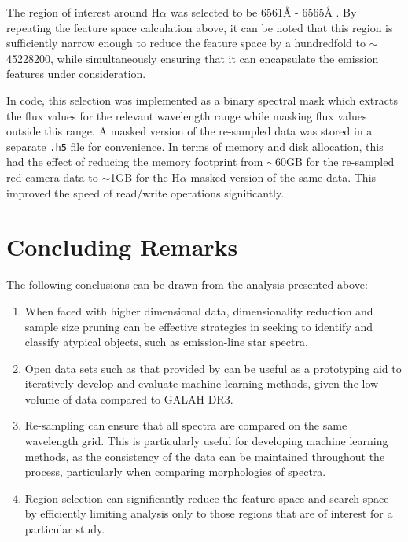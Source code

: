 The region of interest around H$\alpha$ was selected to be 6561\r{A} - 6565\r{A} \citep{traven2017galah}. By repeating the feature space calculation above, it can be noted that this region is sufficiently narrow enough to reduce the feature space by a hundredfold to $\sim$ \num[round-precision=2,round-mode=figures, scientific-notation=true]{45228200}, while simultaneously ensuring that it can encapsulate the emission features under consideration. 

In code, this selection was implemented as a binary spectral mask which extracts the flux values for the relevant wavelength range while masking flux values outside this range. A masked version of the re-sampled data was stored in a separate \texttt{.h5} file for convenience. In terms of memory and disk allocation, this had the effect of reducing the memory footprint from $\sim$60GB for the re-sampled red camera data to $\sim$1GB for the H$\alpha$ masked version of the same data. This improved the speed of read/write operations significantly. 

\section{Concluding Remarks}

The following conclusions can be drawn from the analysis presented above:

\begin{enumerate}
\item When faced with higher dimensional data, dimensionality reduction and sample size pruning can be effective strategies in seeking to identify and classify atypical objects, such as emission-line star spectra. 

\item Open data sets such as that provided by \citet{vcotar2021galah} can be useful as a prototyping aid to iteratively develop and evaluate machine learning methods, given the low volume of data compared to GALAH DR3. 

\item Re-sampling can ensure that all spectra are compared on the same wavelength grid. This is particularly useful for developing machine learning methods, as the consistency of the data can be maintained throughout the process, particularly when comparing morphologies of spectra.  

\item Region selection can significantly reduce the feature space and search space by efficiently limiting analysis only to those regions that are of interest for a particular study. 
\end{enumerate}

